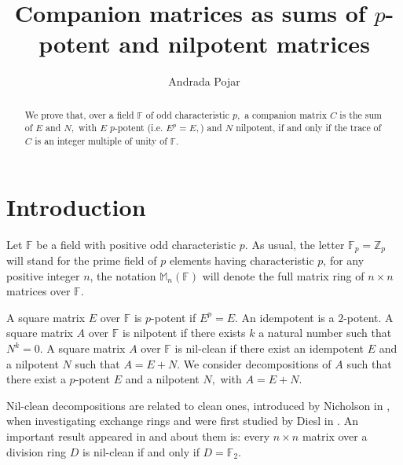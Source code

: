 \documentclass[11pt]{amsart}
\theoremstyle{definition}
\numberwithin{equation}{section}
\newcommand{\F}{\mathbb{F}}
\begin{document}
\title{Companion matrices as sums of $p$-potent and nilpotent matrices}


\author[A. Pojar]{Andrada Pojar}
\address{Technical University of Cluj-Napoca, Department of Mathematics, Str. Memorandumului 28, 400114, Cluj-Napoca, Romania}




\begin{abstract}
We prove that, over a field $\F$ of odd characteristic $p,$ a companion matrix $C$  is the sum of $E$ and $N,$ with $E$ $p$-potent (i.e. $E^p=E,$) and $N$ nilpotent, if and only if the trace of $C$ is an integer multiple of unity of $\F.$
\end{abstract}



\maketitle

\section{Introduction}

Let $\F$ be a field with positive odd characteristic $p.$
As usual, the letter $\F_p=\mathbb{Z}_p$ will stand for the prime field of $p$ elements having characteristic $p$, for any positive integer $n$, the notation $\mathbb{M}_n(\F)$ will denote the full matrix ring of $n\times n$ matrices over $\F.$



A square matrix $E$ over $\F$ is $p$-potent if $E^p=E.$ An idempotent is a $2$-potent. A square matrix $A$ over $\F$ is nilpotent if there exists $k$ a natural number such that $N^k=0.$ A square matrix $A$ over $\F$ is nil-clean if there exist an idempotent $E$ and a nilpotent $N$ such that $A=E+N.$ We consider decompositions of $A$ such that there exist a $p$-potent $E$ and a nilpotent $N,$ with $A=E+N.$

Nil-clean decompositions are related to clean ones, introduced by Nicholson in \cite{N}, when investigating exchange rings and were first studied by Diesl in \cite{Diesl}. An important result appeared in \cite{BCDM} and \cite{KLZ} about them is: every $n\times n$ matrix over a division ring $D$ is nil-clean if and only if $D=\F_2.$
\end{document}
